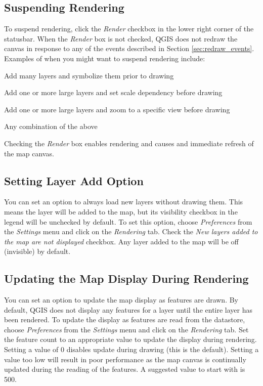 \subsection{Suspending Rendering}
To suspend rendering, click the \textit{Render} checkbox in the lower right
corner of the statusbar. When the \textit{Render} box is not checked, QGIS does
not redraw the canvas in response to any of the events described in Section
\ref{sec:redraw_events}. Examples of when you might want to suspend rendering
include:
\begin{compactitem}
\item Add many layers and symbolize them prior to drawing
\item Add one or more large layers and set scale dependency before drawing
\item Add one or more large layers and zoom to a specific view before drawing
\item Any combination of the above
\end{compactitem}
Checking the \textit{Render} box enables rendering and causes and immediate
refresh of the map canvas.
\subsection{Setting Layer Add
Option}
You can set an option to always load new layers without drawing them. This means
the layer will be added to the map, but its visibility checkbox in the legend
will be unchecked by default. To set this option, choose \textit{Preferences} from the
\textit{Settings} menu and click on the \textit{Rendering} tab. Check the
\textit{New layers added to the map are not displayed} checkbox. Any layer added
to the map will be off (invisible) by default.
\subsection{Updating the Map Display During Rendering}
You can set an option to update the map display as features are drawn. By
default, QGIS does not display any features for a layer until the entire layer
has been rendered. To update the display as features are read from the
datastore, choose \textit{Preferences} from the
\textit{Settings} menu and click on the \textit{Rendering} tab. Set the feature
count to an appropriate value to update the display during rendering. Setting a
value of 0 disables update during drawing (this is the default). Setting a value
too low will result in poor performance as the map canvas is continually updated
during the reading of the features. A suggested value to start with is 500. 

